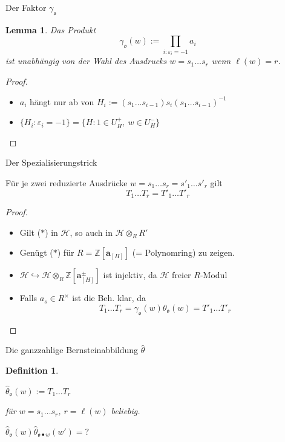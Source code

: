 \documentclass[pdf]{beamer}
\newcommand{\bbf}[1]{\mathds{#1}}
\newcommand{\Z}{\bbf{Z}}
\newtheorem*{lemma*}{Lemma}
\newtheorem*{def*}{Definition}
\begin{document}
\begin{frame}{Der Faktor $\gamma_\mathfrak{o}$}
   \begin{lemma*}
      Das Produkt
      \[ \gamma_{\mathfrak{o}}(w) := \prod_{i : \varepsilon_i = -1} a_i \]
      ist unabhängig von der Wahl des Ausdrucks $w = s_1 \dots s_r$ wenn $\ell(w) = r$.
   \end{lemma*}
   \pause\begin{proof}
      \begin{itemize}
         \item<3-> $a_i$ hängt nur ab von $H_i := (s_1 \dots s_{i-1}) s_i (s_1 \dots s_{i-1})^{-1}$
         \item<4-> $\{ H_i : \varepsilon_i = -1\} = \{ H : 1 \in U^+_H,\ w \in U^-_H \}$
      \end{itemize}
   \end{proof}
\end{frame}

\begin{frame}{Der Spezialisierungstrick}
   \begin{lemma}
      Für je zwei reduzierte Ausdrücke $w = s_1 \dots s_r = s'_1 \dots s'_r$ gilt
      \begin{equation} T_1 \dots T_r = T'_1 \dots T'_r \tag{$\ast$} \end{equation}
   \end{lemma}
   \pause\begin{proof}
      \begin{itemize}
         \item<2-> Gilt ($\ast$) in $\mathcal{H}$, so auch in $\mathcal{H}\otimes_R R'$
         \item<3-> Genügt ($\ast$) für $R = \Z[\mathbf{a}_{[H]}]$ (= Polynomring) zu zeigen.
         \item<4-> $\mathcal{H} \hookrightarrow \mathcal{H}\otimes_R \Z[\mathbf{a}_{[H]}^{\pm }]$ ist injektiv, da $\mathcal{H}$ freier $R$-Modul
         \item<5-> Falls $a_s \in R^\times$ ist die Beh. klar, da
            \[ T_1 \dots T_r = \gamma_{\mathfrak{o}}(w) \theta_{\mathfrak{o}}(w) = T'_1 \dots T'_r \]
      \end{itemize}
   \end{proof}
\end{frame}

\begin{frame}{Die ganzzahlige Bernsteinabbildung $\widehat{\theta}$}
   \begin{def*}
      \begin{center}$\widehat{\theta}_{\mathfrak{o}}(w) := T_1 \dots T_r$\end{center}
      für $w = s_1 \dots s_r$, $r = \ell(w)$ beliebig.
   \end{def*}
   \pause \begin{problem}
      \begin{center}$\widehat{\theta}_{\mathfrak{o}}(w)\widehat{\theta}_{\mathfrak{o}\bullet{}w}(w') = \text{?}$\end{center}
   \end{problem}
\end{frame}
\end{document}
